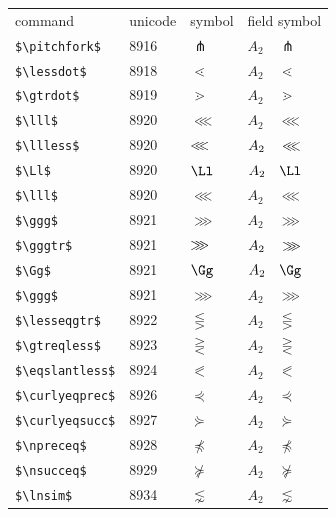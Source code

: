 ﻿\documentclass{article}
\begin{document}
\begin{table}
\begin{center}
\begin{tabular}{llll}
 command                      & unicode & symbol                & field symbol\\
 \verb#$\pitchfork$#          & 8916    & $\pitchfork$          & $A_2\quad \pitchfork$\\
 \verb#$\lessdot$#            & 8918    & $\lessdot$            & $A_2\quad \lessdot$\\
 \verb#$\gtrdot$#             & 8919    & $\gtrdot$             & $A_2\quad \gtrdot$\\
 \verb#$\lll$#                & 8920    & $\lll$                & $A_2\quad \lll$\\
 \verb#$\llless$#             & 8920    & $\llless$             & $A_2\quad \llless$\\
 \verb#$\Ll$#                 & 8920    & $\Ll$                 & $A_2\quad \Ll$\\
 \verb#$\lll$#                & 8920    & $\lll$                & $A_2\quad \lll$\\
 \verb#$\ggg$#                & 8921    & $\ggg$                & $A_2\quad \ggg$\\
 \verb#$\gggtr$#              & 8921    & $\gggtr$              & $A_2\quad \gggtr$\\
 \verb#$\Gg$#                 & 8921    & $\Gg$                 & $A_2\quad \Gg$\\
 \verb#$\ggg$#                & 8921    & $\ggg$                & $A_2\quad \ggg$\\
 \verb#$\lesseqgtr$#          & 8922    & $\lesseqgtr$          & $A_2\quad \lesseqgtr$\\
 \verb#$\gtreqless$#          & 8923    & $\gtreqless$          & $A_2\quad \gtreqless$\\
 \verb#$\eqslantless$#        & 8924    & $\eqslantless$        & $A_2\quad \eqslantless$\\
 \verb#$\curlyeqprec$#        & 8926    & $\curlyeqprec$        & $A_2\quad \curlyeqprec$\\
 \verb#$\curlyeqsucc$#        & 8927    & $\curlyeqsucc$        & $A_2\quad \curlyeqsucc$\\
 \verb#$\npreceq$#            & 8928    & $\npreceq$            & $A_2\quad \npreceq$\\
 \verb#$\nsucceq$#            & 8929    & $\nsucceq$            & $A_2\quad \nsucceq$\\
 \verb#$\lnsim$#              & 8934    & $\lnsim$              & $A_2\quad \lnsim$\\

\end{tabular}
\end{center}
\end{table}
\end{document}
